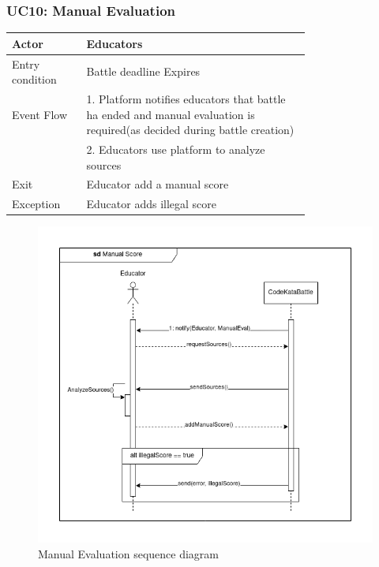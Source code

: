 \subsubsection{UC10: Manual Evaluation}
\begin{center}
    \begin{longtable}{lp{0.75\linewidth}}
        \hline
            Actor & Educators\\
        \hline
            Entry condition & Battle deadline Expires\\
        \hline
            Event Flow & 1. Platform notifies educators that battle ha ended and manual evaluation is required(as decided during battle creation)\\
                       & 2. Educators use platform to analyze sources\\
        \hline
            Exit & Educator add a manual score\\
        \hline
            Exception & Educator adds illegal score\\
        \hline
    \end{longtable}
\end{center}

\begin{figure}[H]
    \centering
    \includegraphics[width=1\linewidth]{misc//Images//UC Diagrams/UC10.png}
    \caption{Manual Evaluation sequence diagram}
    \label{fig:enter-label}
\end{figure}

